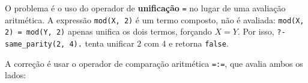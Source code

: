 \begin{solution}
O problema é o uso do operador de \textbf{unificação} \texttt{=} no lugar de uma avaliação aritmética. A expressão \texttt{mod(X, 2)} é um termo composto, não é avaliada: \texttt{mod(X, 2) = mod(Y, 2)} apenas unifica os dois termos, forçando $X = Y$. Por isso, \texttt{?- same_parity(2, 4).} tenta unificar $2$ com $4$ e retorna \texttt{false}.

A correção é usar o operador de comparação aritmética \texttt{=:=}, que avalia ambos os lados:

\end{solution}



